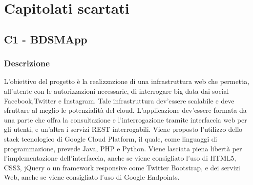 \section{Capitolati scartati}

\subsection{C1 - BDSMApp}

\subsubsection{Descrizione}
L'obiettivo del progetto è la realizzazione di una infrastruttura web che permetta, all'utente con le autorizzazioni necessarie, di interrogare big data dai social Facebook,Twitter e Instagram.
Tale infrastruttura dev'essere scalabile e deve sfruttare al meglio le potenzialità del cloud.
L'applicazione dev'essere formata da una parte che offra la consultazione e l'interrogazione tramite interfaccia web per gli utenti, e un'altra i servizi REST interrogabili. 
Viene proposto l'utilizzo dello stack tecnologico di Google Cloud Platform, il quale, come linguaggi di programmazione, prevede Java, PHP e Python. 
Viene lasciata piena libertà per l'implementazione dell'interfaccia, anche se viene consigliato l'uso di HTML5, CSS3, jQuery o un framework responsive come Twitter Bootstrap, e dei servizi Web, anche se viene consigliato l'uso di Google Endpoints.
